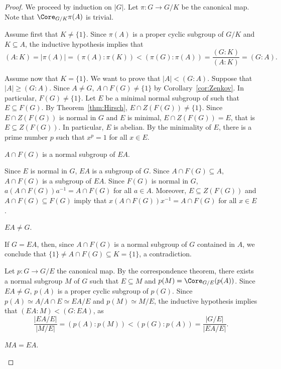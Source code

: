 \begin{proof}
	We proceed by induction on $|G|$. Let $\pi\colon G\to G/K$ be the canonical map. Note that $\Core_{G/K}\pi(A)$ is trivial. 

	Assume first that $K\ne\{1\}$. Since $\pi(A)$ is a proper cyclic subgroup of 
	$G/K$ and $K\subseteq A$, the inductive hypothesis implies that 
	\[
		(A:K)=|\pi(A)|=(\pi(A):\pi(K))<(\pi(G):\pi(A))=\frac{(G:K)}{(A:K)}=(G:A).
	\]

	Assume now that $K=\{1\}$. We want to prove that $|A|<(G:A)$. Suppose that 
	$|A|\geq (G:A)$. Since $A\ne G$, $A\cap F(G)\ne\{1\}$ by Corollary~\ref{cor:Zenkov}. In particular, $F(G)\ne\{1\}$. Let $E$ be a minimal normal subgroup of 
	such that $E\subseteq F(G)$. By Theorem~\ref{thm:Hirsch}, $E\cap Z(F(G))\ne\{1\}$.  Since 
	$E\cap Z(F(G))$ is normal in $G$ and $E$ is minimal, $E\cap Z(F(G))=E$, that is 
	$E\subseteq Z(F(G))$. In particular, $E$ is abelian. By the minimality of 
	$E$, there is a prime number $p$ such that $x^p=1$ for all $x\in E$. 

	\begin{claim}
		$A\cap F(G)$ is a normal subgroup of $EA$.
	\end{claim}

	Since $E$ is normal in $G$, $EA$ is a subgroup of $G$. Since $A\cap
	F(G)\subseteq A$, $A\cap F(G)$ is a subgroup of $EA$.  Since $F(G)$ is 
	normal in $G$, $a(A\cap F(G))a^{-1}=A\cap F(G)$ for all $a\in A$. Moreover, 
    $E\subseteq Z(F(G))$ and $A\cap F(G)\subseteq F(G)$ imply that 
	$x(A\cap F(G))x^{-1}=A\cap F(G)$ for all $x\in E$. 

	\begin{claim}
		$EA\ne G$.
	\end{claim}

	If $G=EA$, then, since $A\cap F(G)$ is a normal subgroup of $G$
	contained in $A$, we conclude that $\{1\}\ne A\cap F(G)\subseteq K=\{1\}$, a 
	contradiction. 

	\medskip
	Let $p\colon G\to G/E$ the canonical map. By the correspondence theorem,
	there exists a normal subgroup $M$ of $G$ such that $E\subseteq M$ and 
	$p(M)=\Core_{G/E}(p(A))$. Since $EA\ne G$, $p(A)$ is a proper cyclic subgroup 
	of $p(G)$. Since $p(A)\simeq A/A\cap E\simeq EA/E$ and $p(M)\simeq
	M/E$, the inductive hypothesis implies that 
	$(EA:M)<(G:EA)$, as 
	\[
	\frac{|EA/E|}{|M/E|}
	=(p(A):p(M))
	<(p(G):p(A))
	=\frac{|G/E|}{|EA/E|}.
	\]

	\begin{claim}
		$MA=EA$. 
	\end{claim}


\end{proof}
